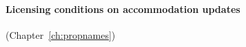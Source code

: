

\paragraph{Licensing conditions on accommodation updates}
(Chapter~\ref{ch:propnames})\nopagebreak

